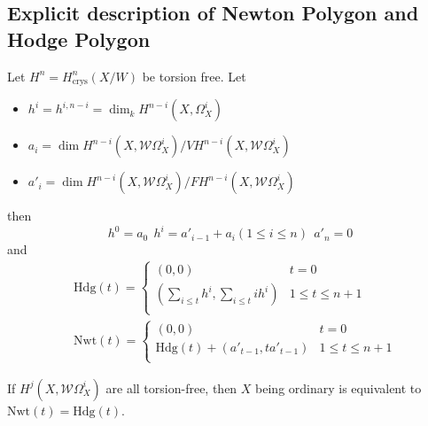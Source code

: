 \subsection{Explicit description of Newton Polygon and Hodge Polygon}
Let $H^n = H^n_{\text{crys}}(X/W)$ be torsion free.  Let 
\begin{itemize}
	\item $h^i= h^{i,n-i}= \dim_k H^{n-i}(X,\Omega_X^i)$
	\item $a_i = \dim H^{n-i}(X,\mathcal{W} \Omega_X^i)/VH^{n-i}(X, \mathcal{W}\Omega_X^i)$
	\item $a'_i = \dim H^{n-i}(X, \mathcal{W}\Omega_X^i)/F H^{n-i}(X,\mathcal{W}\Omega_X^i)$
\end{itemize}
then 
\[
h^0 = a_0\ \ h^i=a'_{i-1} + a_i  (1 \leq i \leq n) \ \ a'_n=0
\]
and 
\[
\begin{aligned}
&\text{Hdg}(t) = \begin{cases} (0,0) & t=0 \\
(\sum_{i \leq t}h^i, \sum_{i\leq t} i h^i)& 1 \leq t \leq n+1\\
\end{cases}\\
&\text{Nwt}(t) = \begin{cases}
(0,0)& t=0\\
\text{Hdg}(t) +(a'_{t-1}, ta'_{t-1})& 1 \leq t \leq n+1\\
\end{cases}
\end{aligned}
\]
\begin{seccor}
	If $H^j(X, \mathcal{W}\Omega_X^i)$ are all torsion-free, then $X$ being ordinary is equivalent to $\text{Nwt}(t) = \text{Hdg}(t)$.
\end{seccor}